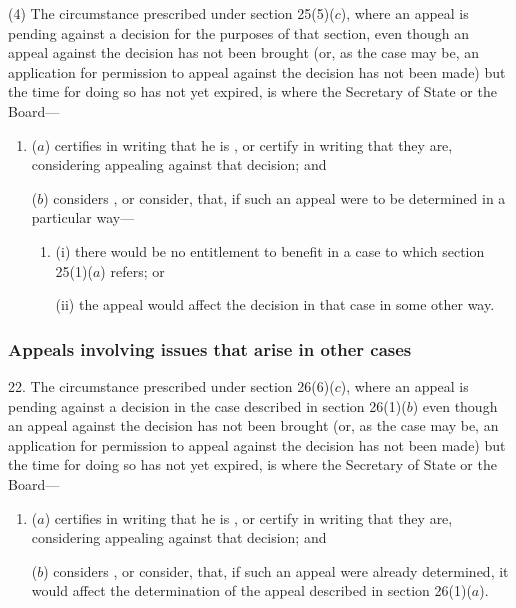 \documentclass[12pt,a4paper]{article}
\begin{document}
(4) The circumstance prescribed under section 25(5)($c$), where an appeal is pending against a decision for the purposes of that section, even though an appeal against the decision has not been brought (or, as the case may be, an application for 
permission  %
to appeal against the decision has not been made) but the time for doing so has not yet expired, is where the Secretary of State
or the Board—  %
\begin{enumerate}\item[]
($a$) certifies in writing that he is%
, or certify in writing that they are,  %
considering appealing against that decision; and

($b$) considers%
, or consider,  %
that, if such an appeal were to be determined in a particular way—
\begin{enumerate}\item[]
(i) there would be no entitlement to benefit in a case to which section 25(1)($a$) refers; or

(ii) the appeal would affect the decision in that case in some other way.
\end{enumerate}
\end{enumerate}


\subsubsection[22. Appeals involving issues that arise in other cases]{Appeals involving issues that arise in other cases}

22.  The circumstance prescribed under section 26(6)($c$), where an appeal is pending against a decision in the case described in section 26(1)($b$) even though an appeal against the decision has not been brought (or, as the case may be, an application for 
permission  %
to appeal against the decision has not been made) but the time for doing so has not yet expired, is where the Secretary of State
or the Board—  %
\begin{enumerate}\item[]
($a$) certifies in writing that he is%
, or certify in writing that they are,  %
considering appealing against that decision; and

($b$) considers%
, or consider,  %
that, if such an appeal were already determined, it would affect the determination of the appeal described in section 26(1)($a$).
\end{enumerate}
\end{document}
